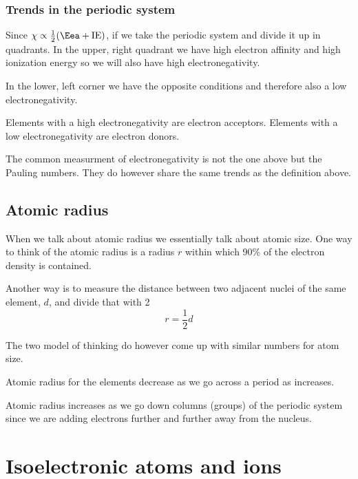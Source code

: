 \documentclass[../mit-general-chemistry.tex]{subfiles}
\begin{document}
\subsubsection{Trends in the periodic system}


Since $\chi \propto \frac{1}{2}(\Eea + \text{IE})$, if we take the
periodic system and divide it up in quadrants. In the upper, right
quadrant we have high electron affinity and high ionization energy so
we will also have high electronegativity.

In the lower, left corner we have the opposite conditions and
therefore also a low electronegativity.

Elements with a high electronegativity are electron
acceptors. Elements with a low electronegativity are electron donors.

The common measurment of electronegativity is not the one above but
the Pauling numbers. They do however share the same trends as the
definition above.






\subsection{Atomic radius}

When we talk about atomic radius we essentially talk about atomic
size. One way to think of the atomic radius is a radius $r$ within
which 90\% of the electron density is contained.

Another way is to measure the distance between two adjacent nuclei of
the same element, $d$, and divide that with 2
\begin{equation*}
  r = \frac{1}{2}d
\end{equation*}

The two model of thinking do however come up with similar numbers for
atom size.

Atomic radius for the elements decrease as we go across a period as
\Zeff increases.

Atomic radius increases as we go down columns (groups) of the periodic
system since we are adding electrons further and further away from the
nucleus.











\section{Isoelectronic atoms and ions}
\end{document}
